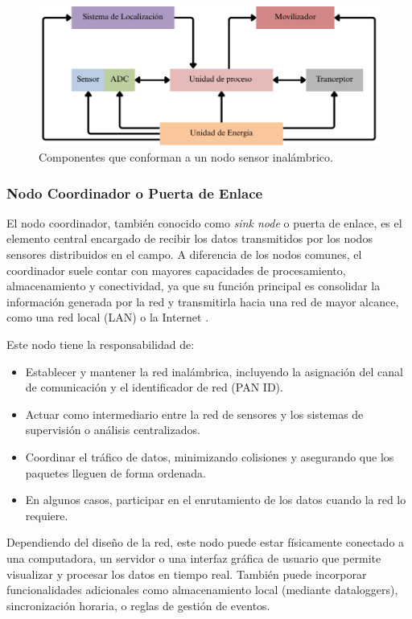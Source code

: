 \begin{figure}[H]
    \centering
    \includegraphics[width=0.6\linewidth]{Documento/Imagenes/Marco Teorico/Nodo sensor.pdf}
    \caption{Componentes que conforman a un nodo sensor inalámbrico.}
    \label{fig:Componentes_nodo}
\end{figure}
\subsubsection*{Nodo Coordinador o Puerta de Enlace}

El nodo coordinador, también conocido como \textit{sink node} o puerta de enlace, es el elemento central encargado de recibir los datos transmitidos por los nodos sensores distribuidos en el campo. A diferencia de los nodos comunes, el coordinador suele contar con mayores capacidades de procesamiento, almacenamiento y conectividad, ya que su función principal es consolidar la información generada por la red y transmitirla hacia una red de mayor alcance, como una red local (LAN) o la Internet \cite{perez2014metodologia}.

Este nodo tiene la responsabilidad de:

\begin{itemize}
    \item Establecer y mantener la red inalámbrica, incluyendo la asignación del canal de comunicación y el identificador de red (PAN ID).
    \item Actuar como intermediario entre la red de sensores y los sistemas de supervisión o análisis centralizados.
    \item Coordinar el tráfico de datos, minimizando colisiones y asegurando que los paquetes lleguen de forma ordenada.
    \item En algunos casos, participar en el enrutamiento de los datos cuando la red lo requiere.
\end{itemize}

Dependiendo del diseño de la red, este nodo puede estar físicamente conectado a una computadora, un servidor o una interfaz gráfica de usuario que permite visualizar y procesar los datos en tiempo real. También puede incorporar funcionalidades adicionales como almacenamiento local (mediante dataloggers), sincronización horaria, o reglas de gestión de eventos.

